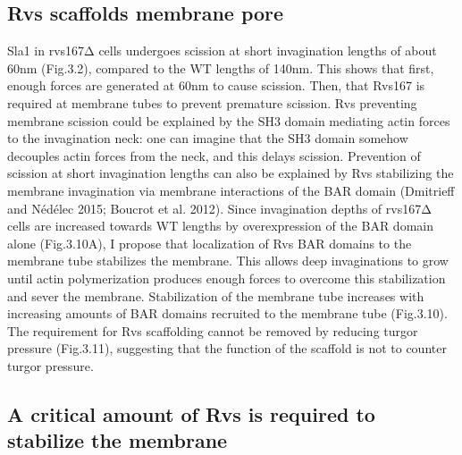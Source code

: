 \subsection{Rvs scaffolds membrane pore}
Sla1 in rvs167Δ cells undergoes scission at short invagination lengths of about 60nm (Fig.3.2), compared to the WT lengths of 140nm. This shows that first, enough forces are generated at 60nm to cause scission. Then, that Rvs167 is required at membrane tubes to prevent premature scission. Rvs preventing membrane scission could be explained by the SH3 domain mediating actin forces to the invagination neck: one can imagine that the SH3 domain somehow decouples actin forces from the neck, and this delays scission. Prevention of scission at short invagination lengths can also be explained by Rvs stabilizing the membrane invagination via membrane interactions of the BAR domain (Dmitrieff and Nédélec 2015; Boucrot et al. 2012). Since invagination depths of rvs167Δ cells are increased towards WT lengths by overexpression of the BAR domain alone (Fig.3.10A), I propose that localization of Rvs BAR domains to the membrane tube stabilizes the membrane. This allows deep invaginations to grow until actin polymerization produces enough forces to overcome this stabilization and sever the membrane. Stabilization of the membrane tube increases with increasing amounts of BAR domains recruited to the membrane tube (Fig.3.10). The requirement for Rvs scaffolding cannot be removed by reducing turgor pressure (Fig.3.11), suggesting that the function of the scaffold is not to counter turgor pressure. 


\subsection{A critical amount of Rvs is required to stabilize the membrane }

